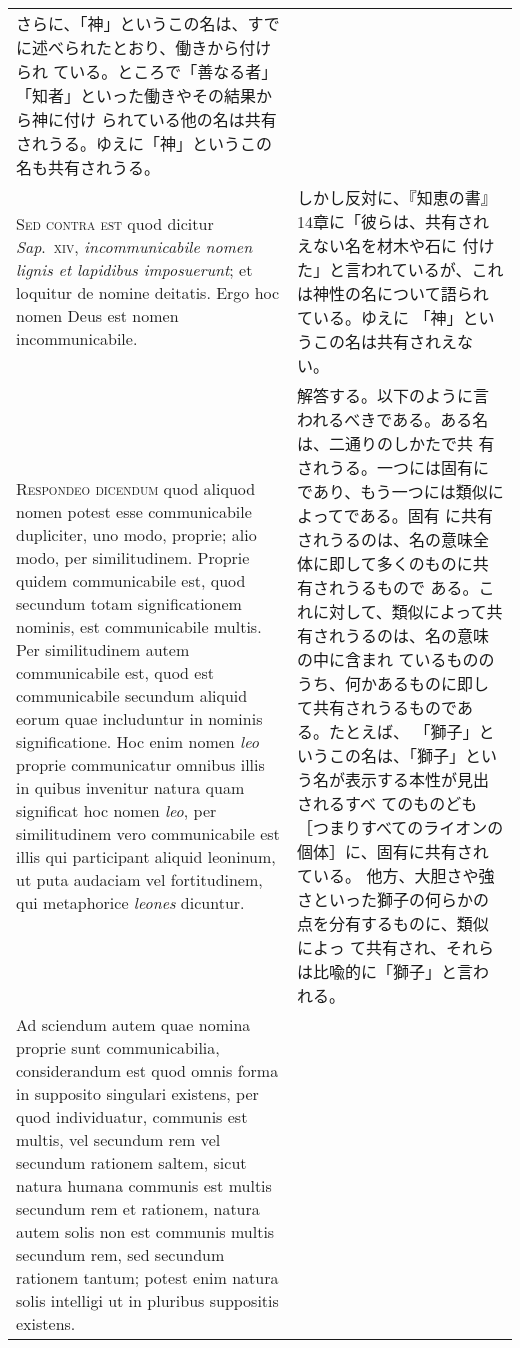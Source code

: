 \documentclass[paper=a4paper,fontsize=10pt,jafontsize=9pt,titlepage]{jlreq}
\begin{document}
\begin{longtable}{p{21em}p{21em}}
さらに、「神」というこの名は、すでに述べられたとおり、働きから付けられ
ている。ところで「善なる者」「知者」といった働きやその結果から神に付け
られている他の名は共有されうる。ゆえに「神」というこの名も共有されうる。

\\

{\scshape Sed contra est} quod dicitur {\itshape Sap}.~{\scshape xiv},
{\itshape incommunicabile nomen lignis et lapidibus imposuerunt}; et
loquitur de nomine deitatis. Ergo hoc nomen Deus est nomen
incommunicabile.

&

しかし反対に、『知恵の書』14章に「彼らは、共有されえない名を材木や石に
付けた」と言われているが、これは神性の名について語られている。ゆえに
「神」というこの名は共有されえない。

\\

{\scshape Respondeo dicendum} quod aliquod nomen potest esse
communicabile dupliciter, uno modo, proprie; alio modo, per
similitudinem. Proprie quidem communicabile est, quod secundum totam
significationem nominis, est communicabile multis. Per similitudinem
autem communicabile est, quod est communicabile secundum aliquid eorum
quae includuntur in nominis significatione. Hoc enim nomen {\itshape
leo} proprie communicatur omnibus illis in quibus invenitur natura
quam significat hoc nomen {\itshape leo}, per similitudinem vero
communicabile est illis qui participant aliquid leoninum, ut puta
audaciam vel fortitudinem, qui metaphorice {\itshape leones} dicuntur.

&

解答する。以下のように言われるべきである。ある名は、二通りのしかたで共
有されうる。一つには固有にであり、もう一つには類似によってである。固有
に共有されうるのは、名の意味全体に即して多くのものに共有されうるもので
ある。これに対して、類似によって共有されうるのは、名の意味の中に含まれ
ているもののうち、何かあるものに即して共有されうるものである。たとえば、
「獅子」というこの名は、「獅子」という名が表示する本性が見出されるすべ
てのものども［つまりすべてのライオンの個体］に、固有に共有されている。
他方、大胆さや強さといった獅子の何らかの点を分有するものに、類似によっ
て共有され、それらは比喩的に「獅子」と言われる。

\\

Ad sciendum autem quae nomina proprie sunt communicabilia,
considerandum est quod omnis forma in supposito singulari existens,
per quod individuatur, communis est multis, vel secundum rem vel
secundum rationem saltem, sicut natura humana communis est multis
secundum rem et rationem, natura autem solis non est communis multis
secundum rem, sed secundum rationem tantum; potest enim natura solis
intelligi ut in pluribus suppositis existens.  &


\end{longtable}
\end{document}
